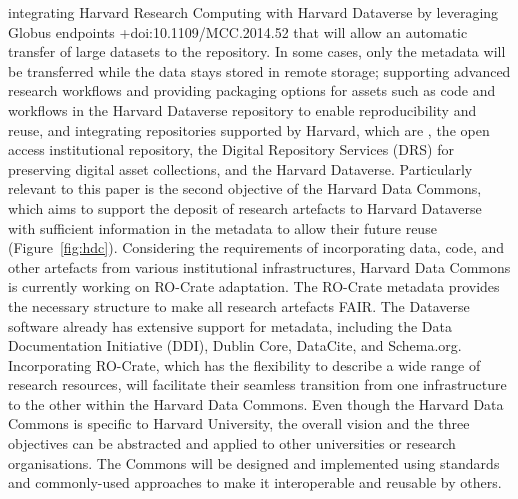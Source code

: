 {}\markdownRendererOlBeginTight
{}integrating Harvard Research Computing with Harvard Dataverse by leveraging Globus endpoints +{}{}{doi:10.1109/MCC.2014.52} that will allow an automatic transfer of large datasets to the repository. In some cases, only the metadata will be transferred while the data stays stored in remote storage;\markdownRendererOlItemEnd 
{}supporting advanced research workflows and providing packaging options for assets such as code and workflows in the Harvard Dataverse repository to enable reproducibility and reuse, and \markdownRendererOlItemEnd 
{}integrating repositories supported by Harvard, which are , the open access institutional repository, the Digital Repository Services (DRS) for preserving digital asset collections, and the Harvard Dataverse.\markdownRendererOlItemEnd 
\markdownRendererOlEndTight \markdownRendererInterblockSeparator
{}Particularly relevant to this paper is the second objective of the Harvard Data Commons, which aims to support the deposit of research artefacts to Harvard Dataverse with sufficient information in the metadata to allow their future reuse (Figure~\ref{fig:hdc}). Considering the requirements of incorporating data, code, and other artefacts from various institutional infrastructures, Harvard Data Commons is currently working on RO-Crate adaptation. The RO-Crate metadata provides the necessary structure to make all research artefacts FAIR. The Dataverse software already has extensive support for metadata, including the Data Documentation Initiative (DDI), Dublin Core, DataCite, and Schema.org. Incorporating RO-Crate, which has the flexibility to describe a wide range of research resources, will facilitate their seamless transition from one infrastructure to the other within the Harvard Data Commons.\markdownRendererInterblockSeparator
{}\markdownRendererInterblockSeparator
{}Even though the Harvard Data Commons is specific to Harvard University, the overall vision and the three objectives can be abstracted and applied to other universities or research organisations. The Commons will be designed and implemented using standards and commonly-used approaches to make it interoperable and reusable by others.\relax